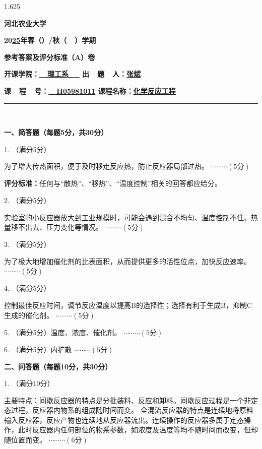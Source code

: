 \documentclass[12pt, a4paper]{article}
\begin{document}
\begin{spacing}{1.625}


\centerline{{\Large \bf{河北农业大学}}}

\centerline{\bf{\Large 20\underline{25}年春（\quad ）/秋（\ \surd \ ）学期}}

\centerline{\Large \bf 参考答案及评分标准（A）卷}

\centerline{\bf 开课学院：\underline{\ \ \quad 理工系 \quad \ \ } \quad 出\ \ 题\ \ 人：\underline{\quad \qquad \qquad 张斌\quad \qquad \qquad}}

\centerline{\bf 课\ \ 程\ \ 号：\underline{\ \ H05981011\quad} \quad 课程名称：\underline{\quad \qquad 化学反应工程 \qquad \quad }}

{{\noindent} \hspace{-2em} \rule[0pt]{16cm}{0.15em}}\\

\vspace{-2em}

{\bf 一、简答题（每题5分，共30分）}

1. （满分5分）

为了增大传热面积，便于及时移走反应热，防止反应器局部过热。 \hfill $\cdots \cdots \cdots (5\text{分})$

{\bf 评分标准：}任何与“散热”、“移热”、“温度控制”相关的回答都应给分。

2. （满分5分）

实验室的小反应器放大到工业规模时，可能会遇到混合不均匀、温度控制不住、热量移不出去、压力变化等情况。 \hfill $\cdots \cdots \cdots (5\text{分})$

3. （满分5分）

为了极大地增加催化剂的比表面积，从而提供更多的活性位点，加快反应速率。 \hfill $\cdots \cdots \cdots (5\text{分})$

4. （满分5分）

控制最佳反应时间，调节反应温度以提高B的选择性；选择有利于生成B，抑制C生成的催化剂。 \hfill $\cdots \cdots \cdots (5\text{分})$

5. （满分5分）温度、浓度、催化剂。 \hfill $\cdots \cdots \cdots (5\text{分})$

6. （满分5分）内扩散 \hfill $\cdots \cdots \cdots (5\text{分})$



{\bf 二、问答题（每题10分，共30分）}

1. （满分10分）

主要特点：间歇反应器的特点是分批装料、反应和卸料。间歇反应过程是一个非定态过程，反应器内物系的组成随时间而变。
全混流反应器的特点是连续地将原料输入反应器，反应产物也连续地从反应器流出。连续操作的反应器多属于定态操作，此时反应器内任何部位的物系参数，如浓度及温度等均不随时间而改变，但却随位置而变。 \hfill $\cdots \cdots \cdots (6\text{分})$


\end{spacing}
\end{document}
